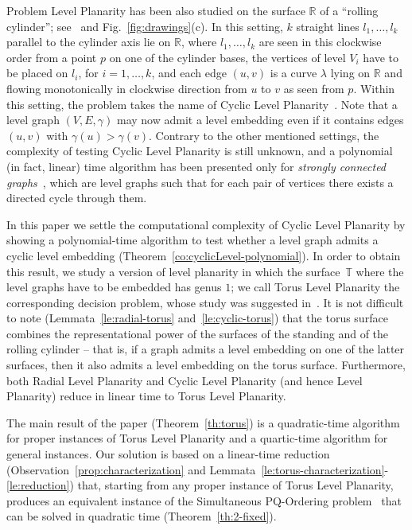 \documentclass{llncs}
\begin{document}
Problem {\sc Level Planarity} has been also studied on the surface $\mathbb R$ of a ``rolling cylinder''; see~\cite{abbg-cpue-12,bb-ltpte-08,bbk-clpte-07,b-updsrc-14} and Fig.~\ref{fig:drawings}(c). 
In this setting, $k$ straight lines $l_1,\dots,l_k$ parallel to the cylinder axis lie on $\mathbb R$, where $l_1,\dots,l_k$ are seen in this clockwise order from a point $p$ on one of the cylinder bases, the vertices of level $V_i$ have to be placed on $l_i$, for $i=1,\dots,k$, and each edge $(u,v)$ is a curve $\lambda$ lying on $\mathbb R$ and flowing monotonically in clockwise direction from $u$ to $v$ as seen from $p$.
Within this setting, the problem takes the name of {\sc Cyclic Level Planarity}~\cite{bbk-clpte-07}.
Note that a level graph $(V,E,\gamma)$ may now admit a level embedding even if it contains edges $(u,v)$ with $\gamma(u)>\gamma(v)$.
Contrary to the other mentioned settings, the complexity of testing {\sc Cyclic Level Planarity} is still unknown, and a polynomial (in fact, linear) time algorithm has been presented only for {\em strongly connected graphs}~\cite{bb-ltpte-08}, which are level graphs such that for each pair of vertices there exists a directed cycle through them. 

In this paper we settle the computational complexity of {\sc Cyclic Level Planarity} by showing a polynomial-time algorithm to test whether a level graph admits a cyclic level embedding (Theorem~\ref{co:cyclicLevel-polynomial}). 
In order to obtain this result, we study a version of level planarity in which the surface~$\mathbb T$ where the level graphs have to be embedded has genus $1$; we call {\sc Torus Level Planarity} the corresponding decision problem, whose study was suggested in~\cite{bbk-clpte-07}. It is not difficult to note (Lemmata~\ref{le:radial-torus} and~\ref{le:cyclic-torus}) that the torus surface combines the representational power of the surfaces of the standing and of the rolling cylinder -- that is, if a graph admits a level embedding on one of the latter surfaces, then it also admits a level embedding on the torus surface. Furthermore, both {\sc Radial Level Planarity} and {\sc Cyclic Level Planarity} (and hence {\sc Level Planarity}) reduce in linear time to {\sc Torus Level Planarity}.

The main result of the paper (Theorem~\ref{th:torus}) is a quadratic-time algorithm for proper instances of {\sc Torus Level Planarity} and a quartic-time algorithm for general instances. Our solution is based on a linear-time reduction (Observation~\ref{prop:characterization} and Lemmata~\ref{le:torus-characterization}-\ref{le:reduction}) that, starting from any proper instance of {\sc Torus Level Planarity}, produces an equivalent instance of the {\sc Simultaneous PQ-Ordering} problem~\cite{br-spacep-13} that can be solved in quadratic time (Theorem~\ref{th:2-fixed}).
\end{document}
